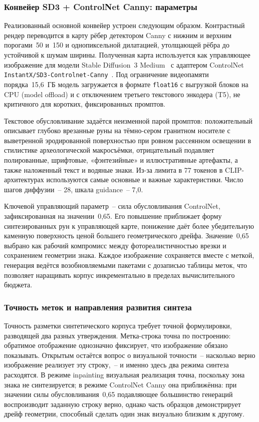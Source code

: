 \documentclass[a4paper,12pt]{extarticle}
\begin{document}
\subsubsection{Конвейер SD3 + ControlNet Canny: параметры}
\label{sec:synth-pipeline}
 
Реализованный основной конвейер устроен следующим образом. Контрастный рендер переводится в карту рёбер детектором Canny с нижним и верхним порогами~50 и~150 и однопиксельной дилатацией, утолщающей рёбра до устойчивой к шумам ширины. Полученная карта используется как управляющее изображение для модели Stable Diffusion~3 Medium~\cite{esser2024sd3} с адаптером ControlNet \texttt{InstantX/SD3-Controlnet-Canny}~\cite{zhang2023controlnet}. Под ограничение видеопамяти порядка~15,6~ГБ модель загружается в формате \texttt{float16} с выгрузкой блоков на CPU (model offload) и с отключением третьего текстового энкодера (T5), не критичного для коротких, фиксированных промптов.
 
Текстовое обусловливание задаётся неизменной парой промптов: положительный описывает глубоко врезанные руны на тёмно-сером гранитном носителе с выветренной эродированной поверхностью при ровном рассеянном освещении в стилистике археологической макросъёмки, отрицательный подавляет полированные, шрифтовые, «фэнтезийные» и иллюстративные артефакты, а также наложенный текст и водяные знаки. Из-за лимита в 77 токенов в CLIP-архитектурах используются самые основные и важные характеристики. Число шагов диффузии~-- 28, шкала guidance~-- 7,0.
 
Ключевой управляющий параметр~-- сила обусловливания ControlNet, зафиксированная на значении~0,65. Его повышение приближает форму синтезированных рун к управляющей карте, понижение даёт более убедительную каменную поверхность ценой большего геометрического дрейфа. Значение~0,65 выбрано как рабочий компромисс между фотореалистичностью врезки и сохранением геометрии знака. Каждое изображение сохраняется вместе с меткой, генерация ведётся возобновляемыми пакетами с дозаписью таблицы меток, что позволяет наращивать корпус инкрементально в пределах вычислительного бюджета.
 
\subsubsection{Точность меток и направления развития синтеза}
\label{sec:synth-fidelity}
 
Точность разметки синтетического корпуса требует точной формулировки, разводящей два разных утверждения. Метка-строка точна по построению: обратимое отображение однозначно фиксирует, что изображение обязано показывать. Открытым остаётся вопрос о визуальной точности~-- насколько верно изображение реализует эту строку,~-- и именно здесь два режима синтеза расходятся. В режиме inpainting визуальная реализация точна, поскольку зона знака не синтезируется; в режиме ControlNet Canny она приближённа: при значении силы обусловливания~0,65 подавляющее большинство генераций воспроизводит заданную строку верно, однако часть образцов демонстрирует дрейф геометрии, способный сделать один знак визуально близким к другому.
 
\end{document}
